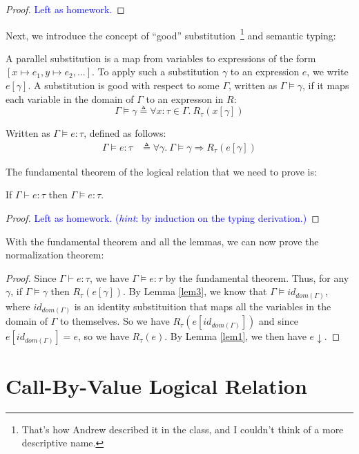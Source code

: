 \documentclass{notes}
\begin{document}
%
\begin{proof}
  \textcolor{blue}{Left as homework.}
\end{proof}
%
\noindent Next, we introduce the concept of ``good'' substitution~\footnote{That's how Andrew described it in the class, and I couldn't think of a more descriptive name.} and semantic typing:
%
\begin{defn}
  A parallel substitution is a map from variables to expressions of the form $[x \mapsto e_1, y \mapsto e_2, ...]$.
  To apply such a substitution $\gamma$ to an expression $e$, we write $e[\gamma]$.
  A substitution is good with respect to some $\Gamma$, written as $\Gamma \vDash \gamma$, if it maps each variable in the domain of $\Gamma$ to an expresson in $R$:
  \[ \Gamma \vDash \gamma \triangleq \forall x : \tau \in \Gamma.\: R_{\tau}(x[\gamma]) \]
\end{defn}
%
\begin{defn}
  Written as $\Gamma \vDash e : \tau$, defined as follows:
  \begin{align*}
    \Gamma \vDash e : \tau & \triangleq \forall \gamma.\: \Gamma \vDash \gamma \Longrightarrow R_{\tau}(e[\gamma])
  \end{align*}
\end{defn}
%
\noindent The fundamental theorem of the logical relation that we need to prove is:
%
\begin{thm}[Fundamental]
  If $\Gamma \vdash e : \tau$ then $\Gamma \vDash e : \tau$.
\end{thm}
%
\begin{proof}
  \textcolor{blue}{Left as homework. (\emph{hint}: by induction on the typing derivation.)}
\end{proof}
%
\noindent With the fundamental theorem and all the lemmas, we can now prove the normalization theorem:
%
\begin{proof}
  Since $\Gamma \vdash e : \tau$, we have $\Gamma \vDash e : \tau$ by the fundamental theorem.
  Thus, for any $\gamma$, if $\Gamma \vDash \gamma$ then $R_{\tau}(e[\gamma])$.
  By Lemma \ref{lem3}, we know that $\Gamma \vDash {id}_{{dom}(\Gamma)}$, where ${id}_{{dom(\Gamma)}}$ is an identity substituition that maps all the variables in the domain of $\Gamma$ to themselves.
  So we have $R_{\tau}(e[{id}_{{dom}(\Gamma)}])$ and since $e[{id}_{{dom}(\Gamma)}] = e$, so we have $R_{\tau}(e)$.
  By Lemma \ref{lem1}, we then have $e \downarrow$.
\end{proof}

\section{Call-By-Value Logical Relation}
\end{document}
